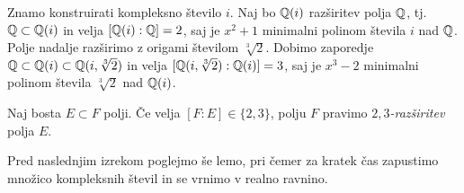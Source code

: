 Znamo konstruirati kompleksno število $i$. Naj bo $\mathbb Q(i)$ razširitev polja $\mathbb Q$, tj.\ $\mathbb Q \subset \mathbb Q(i)$ in velja $[\mathbb Q(i) : \mathbb Q] = 2$, saj je $x^2 + 1$ minimalni polinom števila $i$ nad $\mathbb Q$. Polje nadalje razširimo z origami številom $\sqrt[3]{2}$. Dobimo zaporedje $\mathbb Q \subset \mathbb Q(i) \subset \mathbb Q(i, \sqrt[3]{2})$ in velja $[\mathbb Q(i, \sqrt[3]{2}) : \mathbb Q(i)] = 3$, saj je $x^3 - 2$ minimalni polinom števila $\sqrt[3]{2}$ nad $\mathbb Q(i)$.

\begin{definicija}
    Naj bosta $E \subset F$ polji. Če velja $[F:E] \in \{2,3\}$, polju $F$ pravimo \emph{$2,3$-razširitev} polja $E$.
\end{definicija}

Pred naslednjim izrekom poglejmo še lemo, pri čemer za kratek čas zapustimo množico kompleksnih števil in se vrnimo v realno ravnino.

